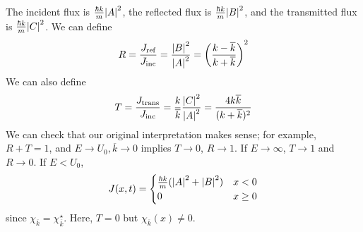 The incident flux is \( \frac{\hbar k}{m} \abs{A}^2 \), the reflected flux is \( \frac{\hbar k}{m} \abs{B}^2 \), and the transmitted flux is \( \frac{\hbar k}{m} \abs{C}^2 \).
We can define
\[
	R = \frac{J_{\text{ref}}}{J_{\text{inc}}} = \frac{\abs{B}^2}{\abs{A}^2} = \qty(\frac{k - \overline k}{k + \overline k})^2
\]
We can also define
\[
	T = \frac{J_{\text{trans}}}{J_{\text{inc}}} = \frac{k}{\overline k} \frac{\abs{C}^2}{\abs{A}^2} = \frac{4k \overline k}{(k + \overline k)^2}
\]
We can check that our original interpretation makes sense; for example, \( R + T = 1 \), and \( E \to U_0, \overline k \to 0 \) implies \( T \to 0 \), \( R \to 1 \).
If \( E \to \infty \), \( T \to 1 \) and \( R \to 0 \).
If \( E < U_0 \),
\[
	J(x,t) =
	\begin{cases}
		\frac{\hbar k}{m} (\abs{A}^2 + \abs{B}^2) & x < 0    \\
		0                                         & x \geq 0
	\end{cases}
\]
since \( \chi_{\overline k} = \chi_{\overline k}^\star \).
Here, \( T = 0 \) but \( \chi_{\overline k}(x) \neq 0 \).
